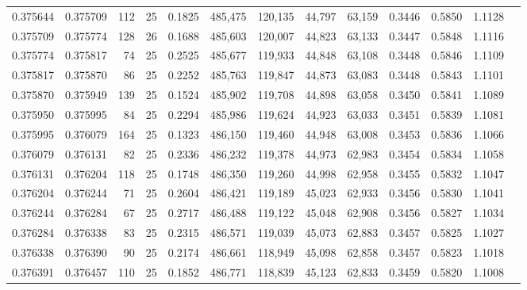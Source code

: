 \begin{tabular}{rrrrrrrrrrrrr}
0.375644 & 0.375709 &   112 &  25 &                                     0.1825 & 485,475 & 120,135 &  44,797 &  63,159 & 0.3446 & 0.5850 & 1.1128 \\
0.375709 & 0.375774 &   128 &  26 &                                     0.1688 & 485,603 & 120,007 &  44,823 &  63,133 & 0.3447 & 0.5848 & 1.1116 \\
0.375774 & 0.375817 &    74 &  25 &                                     0.2525 & 485,677 & 119,933 &  44,848 &  63,108 & 0.3448 & 0.5846 & 1.1109 \\
0.375817 & 0.375870 &    86 &  25 &                                     0.2252 & 485,763 & 119,847 &  44,873 &  63,083 & 0.3448 & 0.5843 & 1.1101 \\
0.375870 & 0.375949 &   139 &  25 &                                     0.1524 & 485,902 & 119,708 &  44,898 &  63,058 & 0.3450 & 0.5841 & 1.1089 \\
0.375950 & 0.375995 &    84 &  25 &                                     0.2294 & 485,986 & 119,624 &  44,923 &  63,033 & 0.3451 & 0.5839 & 1.1081 \\
0.375995 & 0.376079 &   164 &  25 &                                     0.1323 & 486,150 & 119,460 &  44,948 &  63,008 & 0.3453 & 0.5836 & 1.1066 \\
0.376079 & 0.376131 &    82 &  25 &                                     0.2336 & 486,232 & 119,378 &  44,973 &  62,983 & 0.3454 & 0.5834 & 1.1058 \\
0.376131 & 0.376204 &   118 &  25 &                                     0.1748 & 486,350 & 119,260 &  44,998 &  62,958 & 0.3455 & 0.5832 & 1.1047 \\
0.376204 & 0.376244 &    71 &  25 &                                     0.2604 & 486,421 & 119,189 &  45,023 &  62,933 & 0.3456 & 0.5830 & 1.1041 \\
0.376244 & 0.376284 &    67 &  25 &                                     0.2717 & 486,488 & 119,122 &  45,048 &  62,908 & 0.3456 & 0.5827 & 1.1034 \\
0.376284 & 0.376338 &    83 &  25 &                                     0.2315 & 486,571 & 119,039 &  45,073 &  62,883 & 0.3457 & 0.5825 & 1.1027 \\
0.376338 & 0.376390 &    90 &  25 &                                     0.2174 & 486,661 & 118,949 &  45,098 &  62,858 & 0.3457 & 0.5823 & 1.1018 \\
0.376391 & 0.376457 &   110 &  25 &                                     0.1852 & 486,771 & 118,839 &  45,123 &  62,833 & 0.3459 & 0.5820 & 1.1008 \\

\end{tabular}
